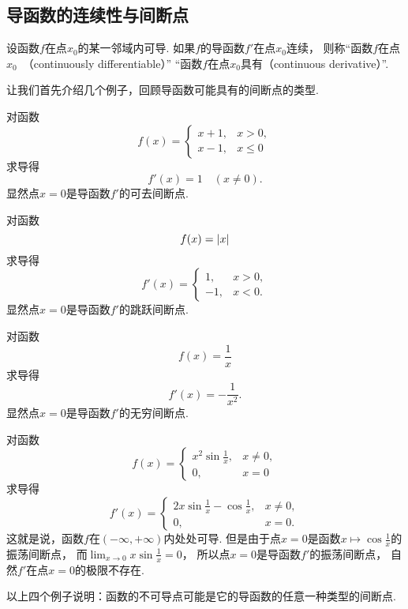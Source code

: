 \subsection{导函数的连续性与间断点}
\begin{definition}
设函数\(f\)在点\(x_0\)的某一邻域内可导.
如果\(f\)的导函数\(f'\)在点\(x_0\)连续，
则称“函数\(f\)在点\(x_0\)~（continuously differentiable）”
“函数\(f\)在点\(x_0\)具有（continuous derivative）”.
\end{definition}

让我们首先介绍几个例子，回顾导函数可能具有的间断点的类型.

\begin{example}
对函数\[
	f(x) = \left\{ \begin{array}{cl}
		x+1, & x>0, \\
		x-1, & x\leq0
	\end{array} \right.
\]求导得\[
	f'(x) = 1
	\quad(x\neq0).
\]
显然点\(x=0\)是导函数\(f'\)的可去间断点.
\end{example}

\begin{example}
对函数\[
	f(x) = \abs{x}
\]求导得\[
	f'(x) = \left\{ \begin{array}{cl}
		1, & x>0, \\
		-1, & x<0.
	\end{array} \right.
\]
显然点\(x=0\)是导函数\(f'\)的跳跃间断点.
\end{example}

\begin{example}
对函数\[
	f(x) = \frac1x
\]求导得\[
	f'(x) = -\frac1{x^2}.
\]
显然点\(x=0\)是导函数\(f'\)的无穷间断点.
\end{example}

\begin{example}
对函数\[
	f(x) = \left\{ \begin{array}{cl}
		x^2 \sin\frac1x, & x \neq 0, \\
		0, & x = 0
	\end{array} \right.
\]求导得\[
	f'(x) = \left\{ \begin{array}{cl}
		2x \sin\frac1x - \cos\frac1x, & x \neq 0, \\
		0, & x = 0.
	\end{array} \right.
\]
这就是说，函数\(f\)在\((-\infty,+\infty)\)内处处可导.
但是由于点\(x=0\)是函数\(x \mapsto \cos\frac1x\)的振荡间断点，
而\(\lim_{x\to0} x \sin\frac1x = 0\)，
所以点\(x=0\)是导函数\(f'\)的振荡间断点，
自然\(f'\)在点\(x=0\)的极限不存在.
\end{example}

以上四个例子说明：函数的不可导点可能是它的导函数的任意一种类型的间断点.
